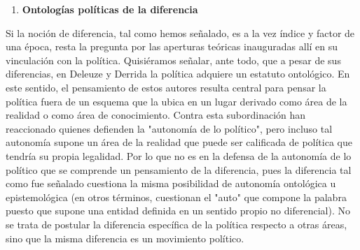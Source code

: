 \documentclass{book}
\begin{document}
\begin{enumerate}
\def\labelenumi{\arabic{enumi}.}
\setcounter{enumi}{4}
\item
  \textbf{Ontologías políticas de la diferencia}
\end{enumerate}

Si la noción de diferencia, tal como hemos señalado, es a la vez índice
y factor de una época, resta la pregunta por las aperturas teóricas
inauguradas allí en su vinculación con la política. Quisiéramos señalar,
ante todo, que a pesar de sus diferencias, en Deleuze y Derrida la
política adquiere un estatuto ontológico. En este sentido, el
pensamiento de estos autores resulta central para pensar la política
fuera de un esquema que la ubica en un lugar derivado como área de la
realidad o como área de conocimiento. Contra esta subordinación han
reaccionado quienes defienden la "autonomía de lo político", pero
incluso tal autonomía supone un área de la realidad que puede ser
calificada de política que tendría su propia legalidad. Por lo que no es
en la defensa de la autonomía de lo político que se comprende un
pensamiento de la diferencia, pues la diferencia tal como fue señalado
cuestiona la misma posibilidad de autonomía ontológica u epistemológica
(en otros términos, cuestionan el "auto" que compone la palabra puesto
que supone una entidad definida en un sentido propio no diferencial). No
se trata de postular la diferencia específica de la política respecto a
otras áreas, sino que la misma diferencia es un movimiento político.
\end{document}
